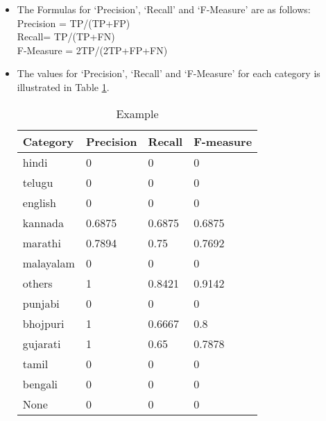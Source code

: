 \begin{itemize}
\item The Formulas for `Precision', `Recall' and `F-Measure' are as follows:\\
Precision = TP/(TP+FP)\\
Recall= TP/(TP+FN)\\
F-Measure = 2TP/(2TP+FP+FN)
\item The values for `Precision', `Recall' and `F-Measure' for each category is illustrated in Table \ref{q3table2}.
\begin{table}
\caption{Example}
\label{q3table2}
\begin{center}
\begin{tabular}{|p{1.5cm}|p{1.5cm}|p{1.5cm}|p{1.5cm}|}
\hline
Category&Precision&Recall&F-measure\\ \hline
hindi&0&0&0\\ \hline
telugu&0&0&0\\ \hline
english&0&0&0\\ \hline
kannada&0.6875&0.6875&0.6875\\ \hline
marathi&0.7894&0.75&0.7692\\ \hline
malayalam&0&0&0\\ \hline
others&1&0.8421&0.9142\\ \hline
punjabi&0&0&0\\ \hline
bhojpuri&1&0.6667&0.8\\ \hline
gujarati&1&0.65&0.7878\\ \hline
tamil&0&0&0\\ \hline
bengali&0&0&0\\ \hline
None&0&0&0\\ \hline
\end{tabular}
\end{center}
\end{table}

\end{itemize}